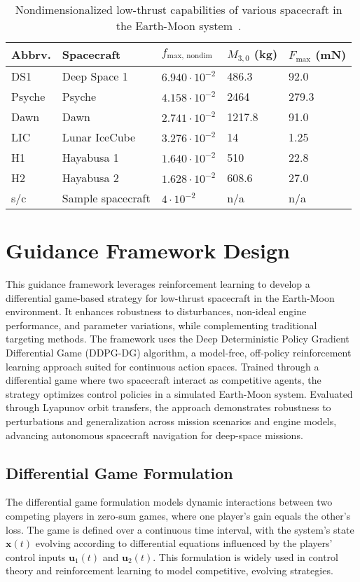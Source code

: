 \documentclass[conference]{IEEEtran}
\begin{document}
\begin{table*}[h!]
	\centering
	\caption{Nondimensionalized low-thrust capabilities of various spacecraft in the Earth-Moon system~\cite{lafarge}.}
	\label{tab:camparison}
	\begin{tabular}{|l|l|l|l|l|}
	\hline
	\textbf{Abbrv.} & \textbf{Spacecraft} & \textbf{$f_{\text{max, nondim}}$} & \textbf{$M_{3,0}$ (kg)} & \textbf{$F_{\text{max}}$ (mN)} \\ \hline
	DS1 & Deep Space 1 & $6.940 \cdot 10^{-2}$ & 486.3 & 92.0 \\ \hline
	Psyche & Psyche & $4.158 \cdot 10^{-2}$ & 2464 & 279.3 \\ \hline
	Dawn & Dawn  & $2.741 \cdot 10^{-2}$ & 1217.8 & 91.0 \\ \hline
	LIC & Lunar IceCube & $3.276 \cdot 10^{-2}$ & 14 & 1.25 \\ \hline
	H1 & Hayabusa 1 & $1.640 \cdot 10^{-2}$ & 510 & 22.8 \\ \hline
	H2 & Hayabusa 2 & $1.628 \cdot 10^{-2}$ & 608.6 & 27.0 \\ \hline
	s/c & Sample spacecraft & $4 \cdot 10^{-2}$ & n/a & n/a \\ \hline
	\end{tabular}
\end{table*}






\section{Guidance Framework Design}
This guidance framework leverages reinforcement learning to develop a differential game-based strategy for low-thrust spacecraft in the Earth-Moon environment. It enhances robustness to disturbances, non-ideal engine performance, and parameter variations, while complementing traditional targeting methods. The framework uses the Deep Deterministic Policy Gradient Differential Game (DDPG-DG) algorithm, a model-free, off-policy reinforcement learning approach suited for continuous action spaces. Trained through a differential game where two spacecraft interact as competitive agents, the strategy optimizes control policies in a simulated Earth-Moon system. Evaluated through Lyapunov orbit transfers, the approach demonstrates robustness to perturbations and generalization across mission scenarios and engine models, advancing autonomous spacecraft navigation for deep-space missions.

\subsection{Differential Game Formulation}
The differential game formulation models dynamic interactions between two competing players in zero-sum games, where one player’s gain equals the other’s loss. The game is defined over a continuous time interval, with the system’s state \( \boldsymbol{x}(t) \) evolving according to differential equations influenced by the players’ control inputs \( \boldsymbol{u}_1(t) \) and \( \boldsymbol{u}_2(t) \). This formulation is widely used in control theory and reinforcement learning to model competitive, evolving strategies.
\end{document}
